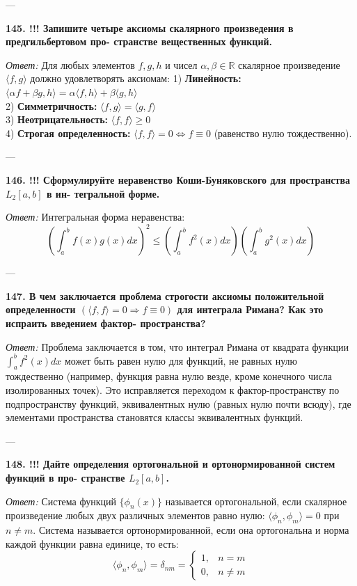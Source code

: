 \documentclass{article}
\begin{document}
---

\textbf{145. !!! Запишите четыре аксиомы скалярного произведения в предгильбертовом про- странстве вещественных функций.}

\textit{Ответ:} Для любых элементов $f, g, h$ и чисел $\alpha, \beta \in \mathbb{R}$ скалярное произведение $\langle f, g \rangle$ должно удовлетворять аксиомам:
1) \textbf{Линейность:} $\langle \alpha f + \beta g, h \rangle = \alpha \langle f, h \rangle + \beta \langle g, h \rangle$ \\
2) \textbf{Симметричность:} $\langle f, g \rangle = \langle g, f \rangle$ \\
3) \textbf{Неотрицательность:} $\langle f, f \rangle \ge 0$ \\
4) \textbf{Строгая определенность:} $\langle f, f \rangle = 0 \iff f \equiv 0$ (равенство нулю тождественно).

---

\textbf{146. !!! Сформулируйте неравенство Коши-Буняковского для пространства $L_{2}[a,b]$ в ин- тегральной форме.}

\textit{Ответ:} Интегральная форма неравенства:
$$ \left( \int_a^b f(x)g(x) dx \right)^2 \le \left( \int_a^b f^2(x) dx \right) \left( \int_a^b g^2(x) dx \right) $$

---

\textbf{147. В чем заключается проблема строгости аксиомы положительной определенности $(\langle f,f\rangle=0\Rightarrow f\equiv0)$ для интеграла Римана? Как это испраить введением фактор- пространства?}

\textit{Ответ:} Проблема заключается в том, что интеграл Римана от квадрата функции $\int_a^b f^2(x)dx$ может быть равен нулю для функций, не равных нулю тождественно (например, функция равна нулю везде, кроме конечного числа изолированных точек). Это исправляется переходом к фактор-пространству по подпространству функций, эквивалентных нулю (равных нулю почти всюду), где элементами пространства становятся классы эквивалентных функций.

---

\textbf{148. !!! Дайте определения ортогональной и ортонормированной систем функций в про- странстве $L_{2}[a,b]$.}

\textit{Ответ:} Система функций $\{\phi_n(x)\}$ называется ортогональной, если скалярное произведение любых двух различных элементов равно нулю: $\langle \phi_n, \phi_m \rangle = 0$ при $n \neq m$. Система называется ортонормированной, если она ортогональна и норма каждой функции равна единице, то есть:
$$ \langle \phi_n, \phi_m \rangle = \delta_{nm} = \begin{cases} 1, & n = m \\ 0, & n \neq m \end{cases} $$
\end{document}
